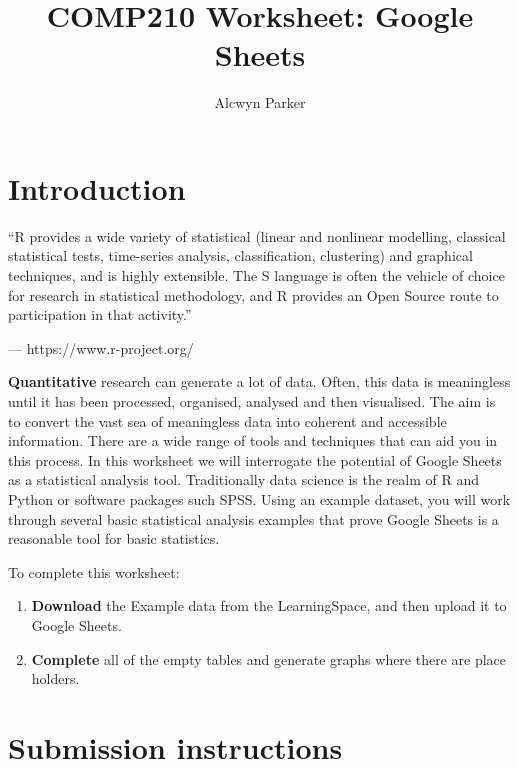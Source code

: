 \documentclass{../../../fal_assignment}
\title{COMP210 Worksheet: Google Sheets}
\author{Alcwyn Parker}
\begin{document}
\maketitle

\section*{Introduction}

\begin{marginquote}
``R provides a wide variety of statistical (linear and nonlinear modelling, classical statistical tests, time-series analysis, classification, clustering) and graphical techniques, and is highly extensible. The S language is often the vehicle of choice for research in statistical methodology, and R provides an Open Source route to participation in that activity.''

--- https://www.r-project.org/
\end{marginquote}

\textbf{Quantitative} research can generate a lot of data. Often, this data is meaningless until it has been processed, organised, analysed and then visualised. The aim is to convert the vast sea of meaningless data into coherent and accessible information. There are a wide range of tools and techniques that can aid you in this process. In this worksheet we will interrogate the potential of Google Sheets as a statistical analysis tool. Traditionally data science is the realm of R and Python or software packages such SPSS. Using an example dataset, you will work through several basic statistical analysis examples that prove Google Sheets is a reasonable tool for basic statistics. 

To complete this worksheet:
\begin{enumerate}[label=(\alph*)]
	\item \textbf{Download} the Example data from the LearningSpace, and then upload it to Google Sheets. 
	\item \textbf{Complete} all of the empty tables and generate graphs where there are place holders. 
\end{enumerate}

\section*{Submission instructions}
\end{document}
